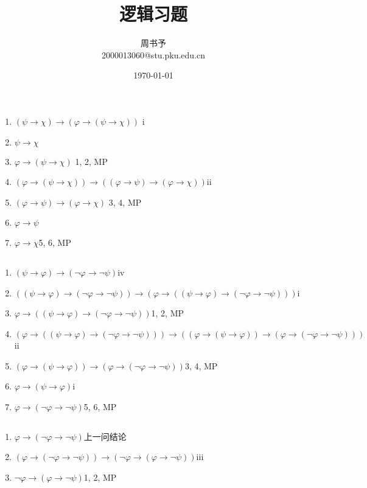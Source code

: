 \documentclass[UTF-8]{ctexart}
\title{\heiti\zihao{1} 逻辑习题}
\author{\kaishu\zihao{-3} 周书予\\2000013060@stu.pku.edu.cn}
\date{\today}
\begin{document}
\maketitle

\section{}
\subsection{}
\begin{enumerate}
	\item $(\psi \to \chi) \to (\varphi \to (\psi \to \chi))$ \hfill i
	\item $\psi \to \chi$
	\item $\varphi \to (\psi \to \chi)$ \hfill 1, 2, MP
	\item $(\varphi \to (\psi \to \chi)) \to ((\varphi \to \psi) \to (\varphi \to \chi))$\hfill ii
	\item $(\varphi \to \psi) \to (\varphi \to \chi)$ \hfill 3, 4, MP
	\item $\varphi \to \psi$
	\item $\varphi \to \chi$\hfill 5, 6, MP
\end{enumerate}
\subsection{}
\begin{enumerate}
	\item $(\psi \to \varphi) \to (\lnot\varphi \to \lnot\psi)$\hfill iv
	\item $((\psi \to \varphi) \to (\lnot\varphi \to \lnot\psi)) \to (\varphi \to ((\psi \to \varphi) \to (\lnot\varphi \to \lnot\psi))) $\hfill i
	\item $\varphi \to ((\psi \to \varphi) \to (\lnot\varphi \to \lnot\psi))$\hfill 1, 2, MP
	\item $(\varphi \to ((\psi \to \varphi) \to (\lnot\varphi \to \lnot\psi)))
	\to ((\varphi \to (\psi \to \varphi)) \to (\varphi \to (\lnot\varphi \to \lnot\psi)))$\hfill ii
	\item $(\varphi \to (\psi \to \varphi)) \to (\varphi \to (\lnot\varphi \to \lnot\psi))$\hfill 3, 4, MP
	\item $\varphi \to (\psi \to \varphi)$\hfill i
	\item $\varphi \to (\lnot\varphi \to \lnot\psi)$\hfill 5, 6, MP
\end{enumerate}
\subsection{}
\begin{enumerate}
	\item $\varphi \to (\lnot\varphi \to \lnot\psi)$\hfill 上一问结论
	\item $(\varphi \to (\lnot\varphi \to \lnot\psi)) \to (\lnot\varphi \to (\varphi \to \lnot \psi))$\hfill iii
	\item $\lnot\varphi \to (\varphi \to \lnot \psi)$\hfill 1, 2, MP
\end{enumerate}
\end{document}
